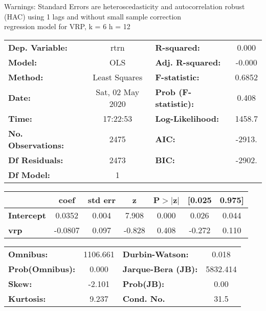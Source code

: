 Warnings: \newline
 [1] Standard Errors are heteroscedasticity and autocorrelation robust (HAC) using 1 lags and without small sample correction\\ 

regression model for VRP, k = 6 h = 12\begin{center}
\begin{tabular}{lclc}
\toprule
\textbf{Dep. Variable:}    &       rtrn       & \textbf{  R-squared:         } &     0.000   \\
\textbf{Model:}            &       OLS        & \textbf{  Adj. R-squared:    } &    -0.000   \\
\textbf{Method:}           &  Least Squares   & \textbf{  F-statistic:       } &    0.6852   \\
\textbf{Date:}             & Sat, 02 May 2020 & \textbf{  Prob (F-statistic):} &    0.408    \\
\textbf{Time:}             &     17:22:53     & \textbf{  Log-Likelihood:    } &    1458.7   \\
\textbf{No. Observations:} &        2475      & \textbf{  AIC:               } &    -2913.   \\
\textbf{Df Residuals:}     &        2473      & \textbf{  BIC:               } &    -2902.   \\
\textbf{Df Model:}         &           1      & \textbf{                     } &             \\
\bottomrule
\end{tabular}
\begin{tabular}{lcccccc}
                   & \textbf{coef} & \textbf{std err} & \textbf{z} & \textbf{P$> |$z$|$} & \textbf{[0.025} & \textbf{0.975]}  \\
\midrule
\textbf{Intercept} &       0.0352  &        0.004     &     7.908  &         0.000        &        0.026    &        0.044     \\
\textbf{vrp}       &      -0.0807  &        0.097     &    -0.828  &         0.408        &       -0.272    &        0.110     \\
\bottomrule
\end{tabular}
\begin{tabular}{lclc}
\textbf{Omnibus:}       & 1106.661 & \textbf{  Durbin-Watson:     } &    0.018  \\
\textbf{Prob(Omnibus):} &   0.000  & \textbf{  Jarque-Bera (JB):  } & 5832.414  \\
\textbf{Skew:}          &  -2.101  & \textbf{  Prob(JB):          } &     0.00  \\
\textbf{Kurtosis:}      &   9.237  & \textbf{  Cond. No.          } &     31.5  \\
\bottomrule
\end{tabular}
\end{center}

